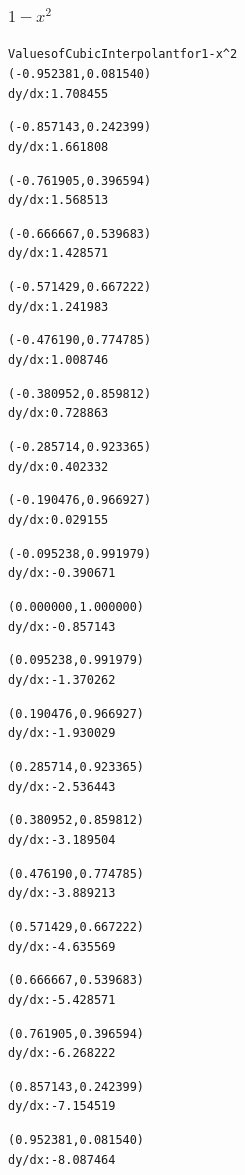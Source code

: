 \documentclass[11pt]{article} %
\begin{document}
\subsubsection*{$1-x^2$}
\begin{alltt}
Values of Cubic Interpolant for 1-x^2
(-0.952381, 0.081540)
 dy/dx:	1.708455

(-0.857143, 0.242399)
 dy/dx:	1.661808

(-0.761905, 0.396594)
 dy/dx:	1.568513

(-0.666667, 0.539683)
 dy/dx:	1.428571

(-0.571429, 0.667222)
 dy/dx:	1.241983

(-0.476190, 0.774785)
 dy/dx:	1.008746

(-0.380952, 0.859812)
 dy/dx:	0.728863

(-0.285714, 0.923365)
 dy/dx:	0.402332

(-0.190476, 0.966927)
 dy/dx:	0.029155

(-0.095238, 0.991979)
 dy/dx:	-0.390671

(0.000000, 1.000000)
 dy/dx:	-0.857143

(0.095238, 0.991979)
 dy/dx:	-1.370262

(0.190476, 0.966927)
 dy/dx:	-1.930029

(0.285714, 0.923365)
 dy/dx:	-2.536443

(0.380952, 0.859812)
 dy/dx:	-3.189504

(0.476190, 0.774785)
 dy/dx:	-3.889213

(0.571429, 0.667222)
 dy/dx:	-4.635569

(0.666667, 0.539683)
 dy/dx:	-5.428571

(0.761905, 0.396594)
 dy/dx:	-6.268222

(0.857143, 0.242399)
 dy/dx:	-7.154519

(0.952381, 0.081540)
 dy/dx:	-8.087464

\end{alltt}
\end{document}
